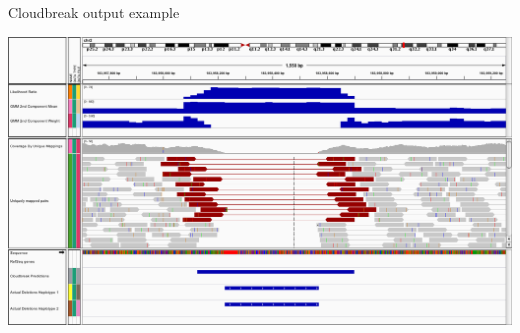 \documentclass{beamer}
\begin{document}

\begin{frame}{Cloudbreak output example}
  \begin{center}   
\includegraphics[width=\textwidth,height=0.8\textheight,keepaspectratio]{Cloudbreak_deletion_example.png}
  \end{center}  
\end{frame}
\end{document}
